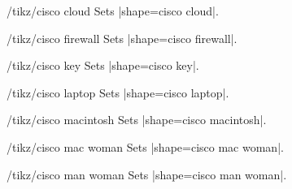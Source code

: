 \documentclass[a4paper]{ltxdoc}
\begin{document}
\begin{stylekey}{/tikz/cisco cloud}
Sets |shape={cisco cloud}|.
\begin{codeexample}[preamble={\usetikzlibrary{shapes.cisco.cloud}}]
\end{codeexample}
\end{stylekey}

\begin{stylekey}{/tikz/cisco firewall}
Sets |shape={cisco firewall}|.
\begin{codeexample}[preamble={\usetikzlibrary{shapes.cisco.firewall}}]
\end{codeexample}
\end{stylekey}

\begin{stylekey}{/tikz/cisco key}
Sets |shape={cisco key}|.
\begin{codeexample}[preamble={\usetikzlibrary{shapes.cisco.key}}]
\end{codeexample}
\end{stylekey}

\begin{stylekey}{/tikz/cisco laptop}
Sets |shape={cisco laptop}|.
\begin{codeexample}[preamble={\usetikzlibrary{shapes.cisco.laptop}}]
\end{codeexample}
\end{stylekey}

\begin{stylekey}{/tikz/cisco macintosh}
Sets |shape={cisco macintosh}|.
\begin{codeexample}[preamble={\usetikzlibrary{shapes.cisco.macintosh}}]
\end{codeexample}
\end{stylekey}

\begin{stylekey}{/tikz/cisco mac woman}
Sets |shape={cisco mac woman}|.
\begin{codeexample}[preamble={\usetikzlibrary{shapes.cisco.macwoman}}]
\end{codeexample}
\end{stylekey}

\begin{stylekey}{/tikz/cisco man woman}
Sets |shape={cisco man woman}|.
\begin{codeexample}[preamble={\usetikzlibrary{shapes.cisco.manwoman}}]
\end{codeexample}
\end{stylekey}
\end{document}
